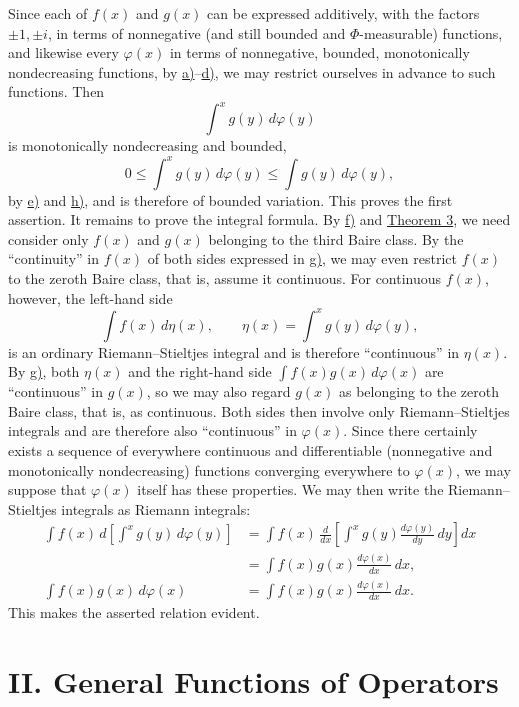 \documentclass[12pt,b5paper,twoside]{article}
\begin{document}
Since each of $f(x)$ and $g(x)$ can be expressed additively, with the factors $\pm1,\pm i$, in terms of nonnegative (and still bounded and $\Phi$-measurable) functions, and likewise every $\varphi(x)$ in terms of nonnegative, bounded, monotonically nondecreasing functions, by \hyperref[prop:I.4.a]{a)}--\hyperref[prop:I.4.d]{d)}, we may restrict ourselves in advance
to such functions. Then
\[
 \int^x g(y)\,d\varphi(y)
\]
is monotonically nondecreasing and bounded,
\[
 0\leq\int^x g(y)\,d\varphi(y)
 \leq\int g(y)\,d\varphi(y),
\]
by \hyperref[prop:I.4.e]{e)} and \hyperref[prop:I.4.h]{h)}, and is therefore of bounded variation. This proves the first assertion. It remains to prove the integral formula. By \hyperref[prop:I.4.f]{f)} and \hyperref[thm:3]{Theorem 3}, we need consider only $f(x)$ and $g(x)$ belonging to the third Baire class. By the ``continuity'' in $f(x)$ of both sides expressed in \hyperref[prop:I.4.g]{g)}, we may even restrict $f(x)$ to the zeroth Baire class, that is, assume it continuous. For continuous $f(x)$, however, the left-hand side
\[
 \int f(x)\,d\eta(x),
 \qquad
 \eta(x)=\int^x g(y)\,d\varphi(y),
\]
is an ordinary Riemann--Stieltjes integral and is therefore ``continuous'' in $\eta(x)$. By \hyperref[prop:I.4.g]{g)}, both $\eta(x)$ and the right-hand side $\int f(x)g(x)\,d\varphi(x)$ are ``continuous'' in $g(x)$, so we may also regard $g(x)$ as belonging to the zeroth Baire class, that is, as continuous. Both sides then involve only Riemann--Stieltjes integrals and are therefore also ``continuous'' in $\varphi(x)$. Since there certainly exists a sequence of everywhere continuous and differentiable (nonnegative and monotonically nondecreasing) functions converging everywhere to $\varphi(x)$, we may suppose that $\varphi(x)$ itself has these properties. We may then write the Riemann--Stieltjes integrals as Riemann integrals:
\label{eq:nested-RS-left}\label{eq:nested-RS-right}
\begin{align*}
 \int f(x)\,d\left[\int^x g(y)\,d\varphi(y)\right]
 &=\int f(x)\,
 \frac{d}{dx}\left[\int^x g(y)\frac{d\varphi(y)}{dy}\,dy\right]dx\\
 &=\int f(x)g(x)\frac{d\varphi(x)}{dx}\,dx,
\\
 \int f(x)g(x)\,d\varphi(x)
 &=\int f(x)g(x)\frac{d\varphi(x)}{dx}\,dx.
\end{align*}
This makes the asserted relation evident.

\section*{II. General Functions of Operators}
\label{sec:II}
\end{document}
